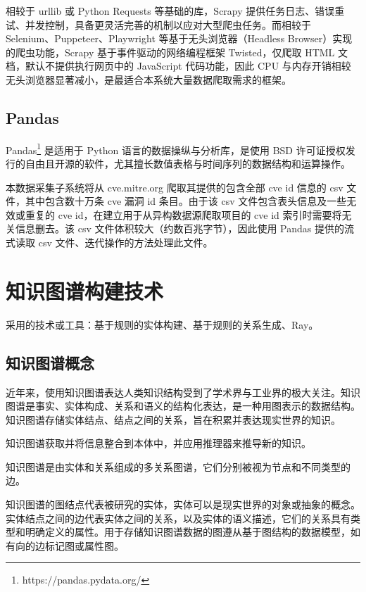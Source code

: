 \documentclass[a4paper,AutoFakeBold,oneside,12pt]{book}
\begin{document}
相较于 urllib 或 Python Requests 等基础的库，Scrapy 提供任务日志、错误重试、并发控制，具备更灵活完善的机制以应对大型爬虫任务。而相较于 Selenium、Puppeteer、Playwright 等基于无头浏览器（Headless Browser）实现的爬虫功能，Scrapy 基于事件驱动的网络编程框架 Twisted，仅爬取 HTML 文档，默认不提供执行网页中的 JavaScript 代码功能，因此 CPU 与内存开销相较无头浏览器显著减小，是最适合本系统大量数据爬取需求的框架。

\subsection{Pandas}

Pandas\footnote{https://pandas.pydata.org/} 是适用于 Python 语言的数据操纵与分析库，是使用 BSD 许可证授权发行的自由且开源的软件，尤其擅长数值表格与时间序列的数据结构和运算操作。

本数据采集子系统将从 cve.mitre.org 爬取其提供的包含全部 cve id 信息的 csv 文件，其中包含数十万条 cve 漏洞 id 条目。由于该 csv 文件包含表头信息及一些无效或重复的 cve id，在建立用于从异构数据源爬取项目的 cve id 索引时需要将无关信息删去。该 csv 文件体积较大（约数百兆字节），因此使用 Pandas 提供的流式读取 csv 文件、迭代操作的方法处理此文件。

\section{知识图谱构建技术}

采用的技术或工具：基于规则的实体构建、基于规则的关系生成、Ray。

\subsection{知识图谱概念}

近年来，使用知识图谱表达人类知识结构受到了学术界与工业界的极大关注。知识图谱是事实、实体构成、关系和语义的结构化表达，是一种用图表示的数据结构。知识图谱存储实体结点、结点之间的关系，旨在积累并表达现实世界的知识。\cite{ji_survey_2022}

\begin{definition}
	知识图谱获取并将信息整合到本体中，并应用推理器来推导新的知识。\cite{DBLP:conf/i-semantics/EhrlingerW16}
\end{definition}
\begin{definition}
	知识图谱是由实体和关系组成的多关系图谱，它们分别被视为节点和不同类型的边。\cite{8047276}
\end{definition}

知识图谱的图结点代表被研究的实体，实体可以是现实世界的对象或抽象的概念。实体结点之间的边代表实体之间的关系，以及实体的语义描述，它们的关系具有类型和明确定义的属性。\cite{ji_survey_2022}用于存储知识图谱数据的图遵从基于图结构的数据模型，如有向的边标记图或属性图。\cite{hogan_knowledge_2022}
\end{document}
